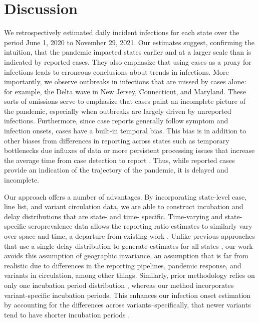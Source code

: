 \section{Discussion}

We retrospectively estimated daily incident infections for each \US state over
the period June 1, 2020 to November 29, 2021. Our estimates suggest, confirming
the intuition, that the pandemic impacted states earlier and at a larger scale
than is indicated by reported cases. They also emphasize that using cases as a
proxy for infections leads to erroneous conclusions about trends in infections.
More importantly, we observe outbreaks in infections that are missed by cases
alone: for example, the Delta wave in New Jersey, Connecticut, and Maryland.
These sorts of omissions serve to emphasize that cases paint an incomplete
picture of the pandemic, especially when outbreaks are largely driven by
unreported infections. Furthermore, since case reports generally follow symptom
and infection onsets, cases have a built-in temporal bias. This bias is in addition
to other biases from differences in reporting across states such as temporary
bottlenecks due influxes of data or more persistent processing issues that
increase the average time from case detection to report \citep{wash2020dash,
dunkel2020covid19}. Thus, while reported cases provide an indication of the
trajectory of the pandemic, it is delayed and incomplete.

Our approach offers a number of advantages. By incorporating state-level case,
line list, and variant circulation data, we are able to construct incubation and
delay distributions that are state- and time- specific. Time-varying and
state-specific seroprevalence data allows the reporting ratio estimates to
similarly vary over space and time, a departure from existing work
\citep{unwin2020state, uga2020covid19}. Unlike previous approaches that use a
single delay distribution to generate estimates for all states
\citep{chitwood2022reconstructing, jahja2022real, miller2022statistical}, our work avoids this
assumption of geographic invariance, an assumption that is far from realistic
due to differences in the reporting pipelines, pandemic response, and variants in
circulation, among other things. Similarly, prior methodology relies on only one incubation
period distribution \citep{miller2022statistical}, 
whereas our method incorporates variant-specific incubation periods.
This enhances our infection onset estimation by accounting for
the differences across variants--specifically, 
that newer variants tend to have shorter incubation periods
\citep{tanaka2022shorter, ogata2022shorter, wu2022incubation}.


